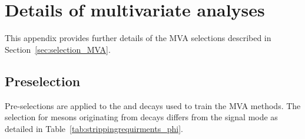 \chapter{Details of multivariate analyses}
\label{ch:appendix_MVAs}

This appendix provides further details of the MVA selections described in Section~\ref{sec:selection_MVA}.

\section{Preselection}
\label{sec:app_mva_preselection}

Pre-selections are applied to the \decay{\Bs}{\jpsi\phiz} and \decay{\Bsb}{\Dsp\pim} decays used to train the MVA methods. 
The selection for \phiz mesons originating from \decay{\Bs}{\jpsi\phiz} decays differs from the signal mode as detailed in Table~\ref{tab:strippingrequirments_phi}. 

